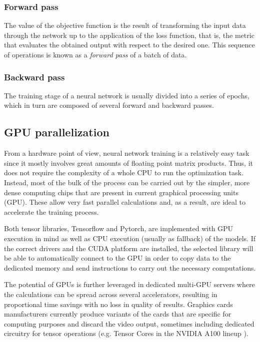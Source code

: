 \subsubsection{Forward pass}

The value of the objective function is the result of transforming the input data through the network up to the application of the loss function, that is, the metric that evaluates the obtained output with respect to the desired one. This sequence of operations is known as a \textit{forward pass} of a batch of data. 


\subsubsection{Backward pass}



The training stage of a neural network is usually divided into a series of epochs, which in turn are composed of several forward and backward passes. 

\subsection{GPU parallelization}

From a hardware point of view, neural network training is a relatively easy task since it mostly involves great amounts of floating point matrix products. Thus, it does not require the complexity of a whole CPU to run the optimization task. Instead, most of the bulk of the process can be carried out by the simpler, more dense computing chips that are present in current graphical processing units (GPU). These allow very fast parallel calculations and, as a result, are ideal to accelerate the training process.

Both tensor libraries, Tensorflow and Pytorch, are implemented with GPU execution in mind as well as CPU execution (usually as fallback) of the models. If the correct drivers and the CUDA platform are installed, the selected library will be able to automatically connect to the GPU in order to copy data to the dedicated memory and send instructions to carry out the necessary computations.

The potential of GPUs is further leveraged in dedicated multi-GPU servers where the calculations can be spread across several accelerators, resulting in proportional time savings with no loss in quality of results. Graphics cards manufacturers currently produce variants of the cards that are specific for computing purposes and discard the video output, sometimes including dedicated circuitry for tensor operations (e.g. Tensor Cores in the NVIDIA A100 lineup ).

